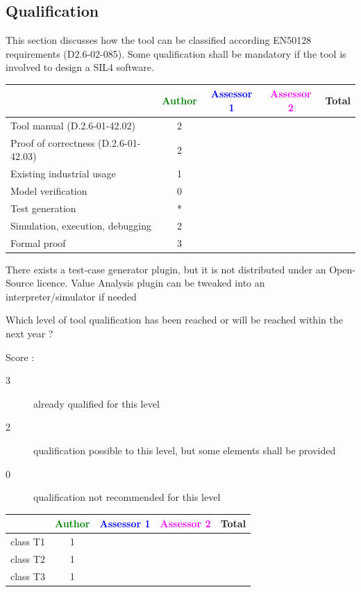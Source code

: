 \subsection{Qualification}

This section discusses how the tool can be classified according EN50128 requirements (D2.6-02-085). Some qualification shall be mandatory  if the tool is involved to design a SIL4 software.


\begin{tabular}{|l | c | c | c | c|}
\hline
& \textcolor{green}{Author} & \textcolor{blue}{Assessor 1} & \textcolor{magenta}{Assessor 2} & Total \\
\hline 
Tool manual (D.2.6-01-42.02) & 2 & & &  \\
\hline
Proof of correctness (D.2.6-01-42.03)   & 2 & & & \\
\hline
Existing industrial  usage  & 1 & & & \\
\hline
Model verification & 0 & & & \\
\hline
Test generation & * & & & \\
\hline
Simulation, execution, debugging & 2 & & & \\
\hline
Formal proof & 3 & & & \\
\hline
\end{tabular}

\begin{author_comment}
There exists a test-case generator plugin, but it is not distributed
under an Open-Source licence. Value Analysis plugin can be tweaked into an
interpreter/simulator if needed
\end{author_comment}

Which level of tool qualification has been reached or will be reached within the next year ?

Score :
\begin{description}
\item[3] already qualified for this level
\item[2] qualification possible to this level, but some elements shall be provided
\item[0] qualification not recommended for this level
\end{description}


\begin{tabular}{|l | c | c | c | c|}
\hline
& \textcolor{green}{Author} & \textcolor{blue}{Assessor 1} & \textcolor{magenta}{Assessor 2} & Total \\
\hline 
class T1 & 1 & & &  \\
\hline
class T2   & 1 & & & \\
\hline
class T3  & 1 & & & \\
\hline
\end{tabular}

